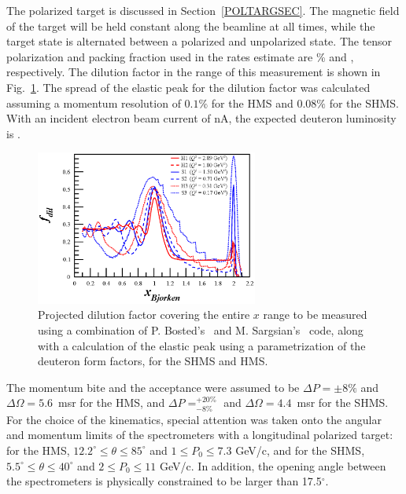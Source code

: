 The polarized \TARGET target is discussed in Section~\ref{POLTARGSEC}.  The magnetic field of the target will be held constant along the beamline at all times, while the target state is alternated between a polarized and unpolarized state.
The tensor polarization and packing fraction used in the rates estimate are \PZZ\% and \PF, respectively. 
The dilution factor in the range of this measurement is shown in Fig.~\ref{fdil_plot}. The spread of the elastic peak for the dilution factor was calculated assuming a momentum resolution of $0.1\%$ for the HMS and $0.08\%$ for the SHMS.
With an incident electron beam current of \CURRENT nA, the expected deuteron luminosity is \LUMI.



\begin{figure}
\begin{center}
\includegraphics[width=0.65\textwidth]{figs/Pzz_30_fdil_all.eps} 
\caption{\label{fdil_plot}Projected dilution factor covering the entire $x$ range to be measured using a combination of P. Bosted's~\cite{Bosted:2012qc} and M. Sargsian's~\cite{misak-convo} code, along with a calculation of the elastic peak using a parametrization of the deuteron form factors, for the SHMS and HMS.}
\end{center}
\end{figure}


The momentum bite and the acceptance were assumed to be $\Delta P = \pm 8\%$ and $\Delta\Omega = 5.6$~msr for the HMS, and $\Delta P= ^{+20\%}_{-8\%}$ 
and $\Delta\Omega =4.4$~msr for the SHMS. 
%
For the choice of the kinematics,
special attention was taken onto the angular and momentum limits of the spectrometers with a longitudinal polarized target: for the
HMS, $12.2^{\circ} \le \theta \le 85^{\circ}$ and $1 \le P_0 \le 7.3$ GeV/c, and for the SHMS,
$5.5^{\circ} \le \theta \le 40^{\circ}$ and $2 \le P_0 \le 11$ GeV/c. In addition, the
opening angle between the spectrometers is physically constrained to be larger than 17.5$^{\circ}$.

